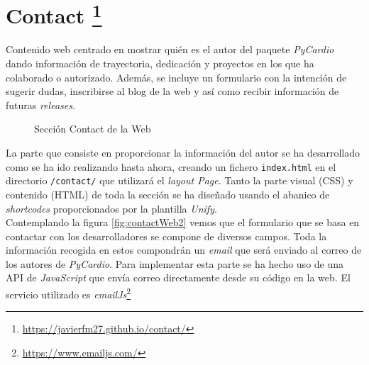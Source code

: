
\section[Contact]{Contact \footnote{\url{https://javierfm27.github.io/contact/}}}
\label{sec:contactWeb}
Contenido web centrado en mostrar quién es el autor del paquete \textit{PyCardio} dando información de trayectoria, dedicación y proyectos en los que ha colaborado o autorizado. Además, se incluye un formulario con la intención de sugerir dudas, inscribirse al blog de la web y así como recibir información de futuras \textit{releases}.

\begin{figure}[H]
    \centering
    \caption{Sección Contact de la Web}
    \label{fig:contactWeb}
\end{figure}


La parte que consiste en proporcionar la información del autor se ha desarrollado como se ha ido realizando hasta ahora, creando un fichero \texttt{index.html} en el directorio \texttt{/contact/} que utilizará el \textit{layout Page}. Tanto la parte visual (CSS) y contenido (HTML) de toda la sección se ha diseñado usando el abanico de \textit{shortcodes} proporcionados por la plantilla \textit{Unify}. \\

Contemplando la figura  \ref{fig:contactWeb2} vemos que el formulario que se basa en contactar con los desarrolladores se compone de diversos campos. Toda la información recogida en estos compondrán un \textit{email} que será enviado al correo de los autores de \textit{PyCardio}. Para implementar esta parte se ha hecho uso de una API de \textit{JavaScript} que envía correo directamente desde su código en la web. El servicio utilizado es \textit{emailJs}\footnote{\url{https://www.emailjs.com/}}

